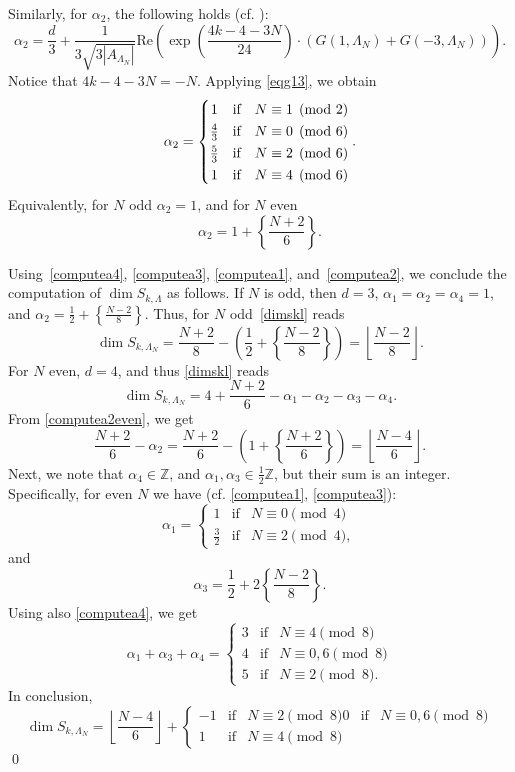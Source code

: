 \documentclass[11pt]{amsart}
\numberwithin{equation}{subsection}
\theoremstyle{plain}
\theoremstyle{remark}
\theoremstyle{definition}
\newcommand{\bZ}{\mathbb{Z}}
\begin{document}
%
Similarly, for $\alpha_2$, the following holds (cf. \cite[Eq. (13)]{bruinier}):
%
$$\alpha_2=\frac{d}{3}+\frac{1}{3\sqrt{3 |A_{\Lambda_N}|}} \mathrm{Re}\left(\exp\left(\frac{4k-4-3N}{24}\right)\cdot
\left(G(1,\Lambda_N)+G(-3,\Lambda_N)\right)\right).$$
%
Notice that $4k-4-3N=-N$. Applying \eqref{eqg13}, we obtain
\begin{equation}\label{computea2}
\alpha_2=\left\{
\renewcommand*{\arraystretch}{1.3}
\begin{matrix}
1&\textrm{if}&N\equiv 1 \pmod 2\\
\frac{4}{3}&\textrm{if}&N\equiv 0 \pmod 6\\
\frac{5}{3}&\textrm{if}&N\equiv 2 \pmod 6\\
1&\textrm{if}&N\equiv 4 \pmod 6
\end{matrix}
\right. .
\end{equation}
Equivalently, for $N$ odd $\alpha_2=1$, and for $N$ even 
\begin{equation}\label{computea2even}
\alpha_2=1+\left\{\frac{N+2}{6}\right\}.
\end{equation}


Using~\eqref{computea4}, \eqref{computea3}, \eqref{computea1}, and~\eqref{computea2}, we conclude the computation of $\dim S_{k,\Lambda}$ as follows. If $N$ is odd, then $d=3$, $\alpha_1=\alpha_2=\alpha_4=1$, and $\alpha_2=\frac{1}{2}+\left\{\frac{N-2}{8}\right\}$. Thus, for $N$ odd~\eqref{dimskl} reads
%
\begin{equation}\label{dimpicodd}
\dim S_{k,\Lambda_N}=\frac{N+2}{8}-\left(\frac{1}{2}+\left\{\frac{N-2}{8}\right\}\right)=\left\lfloor \frac{N-2}{8}\right\rfloor. 
\end{equation}
%
For $N$ even, $d=4$, and thus \eqref{dimskl} reads
$$\dim S_{k,\Lambda_N}=4+\frac{N+2}{6}-\alpha_1-\alpha_2-\alpha_3-\alpha_4.$$
From \eqref{computea2even}, we get
$$\frac{N+2}{6}-\alpha_2=\frac{N+2}{6}- \left(1+\left\{\frac{N+2}{6}\right\}\right)=
\left\lfloor \frac{N-4}{6}\right\rfloor.$$
Next, we note that $\alpha_4\in\bZ$, and $\alpha_1,\alpha_3\in \frac{1}{2}\bZ$, but their sum is an integer. Specifically, for even $N$ we have (cf. \eqref{computea1}, \eqref{computea3}): 
%
$$\alpha_1=\left\{
\begin{matrix}
1&\textrm{if}&N\equiv 0 \pmod 4\\
\frac{3}{2}&\textrm{if}&N\equiv 2 \pmod 4,
\end{matrix}
\right.$$
and 
%
$$\alpha_3=\frac{1}{2}+2\left\{\frac{N-2}{8}\right\}.$$
%
Using also \eqref{computea4}, we get
%
$$\alpha_1+\alpha_3+\alpha_4=\left\{\begin{matrix}
3&\textrm{if}&N\equiv 4 \pmod 8 \\
4&\textrm{if}&N\equiv 0,6 \pmod 8\\
5&\textrm{if}&N\equiv 2 \pmod 8.
\end{matrix}
\right.$$
%
In conclusion, 
%
\begin{equation}\label{dimpiceven}
\dim S_{k,\Lambda_N}=\left\lfloor \frac{N-4}{6}\right\rfloor+\left\{\begin{matrix}
-1&\textrm{if}&N\equiv 2 \pmod 8
0&\textrm{if}&N\equiv 0,6 \pmod 8\\
1&\textrm{if}&N\equiv 4 \pmod 8
\end{matrix}
\right.
\end{equation}
%
\qed
%
\end{document}
